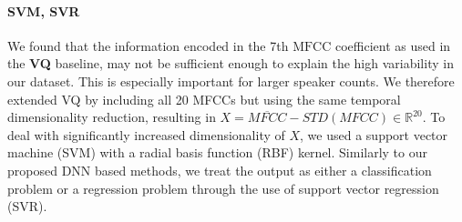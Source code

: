 \paragraph*{\textbf{SVM, SVR}}
We found that the information encoded in the 7th \(\mbox{MFCC}\) coefficient as used in the \textbf{VQ} baseline, may not be sufficient enough to  explain the high variability in our dataset.
This is especially important for larger speaker counts.
We therefore extended \textsc{VQ} by including all 20 MFCCs but using the same temporal dimensionality reduction, resulting in \(X = \overline{MFCC} - STD(MFCC) \in \mathbb{R}^{20}\).
To deal with significantly increased dimensionality of \(X\), we used a support vector machine (SVM) with a radial basis function (RBF) kernel.
Similarly to our proposed DNN based methods, we treat the output as either a classification problem or a regression problem through the use of support vector regression (SVR).

